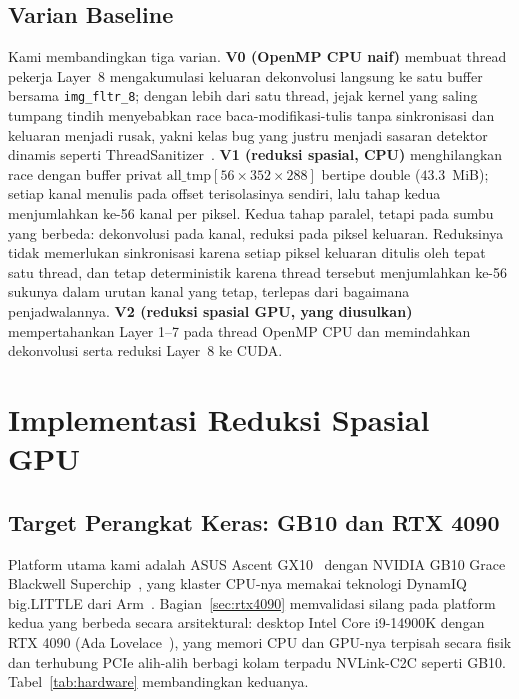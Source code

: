 \documentclass[conference]{IEEEtran}
\begin{document}
\subsection{Varian Baseline}
Kami membandingkan tiga varian. \textbf{V0 (OpenMP CPU naif)} membuat thread pekerja Layer~8 mengakumulasi keluaran dekonvolusi langsung ke satu buffer bersama \texttt{img\_fltr\_8}; dengan lebih dari satu thread, jejak kernel yang saling tumpang tindih menyebabkan race baca-modifikasi-tulis tanpa sinkronisasi dan keluaran menjadi rusak, yakni kelas bug yang justru menjadi sasaran detektor dinamis seperti ThreadSanitizer~\cite{serebryany2009threadsanitizer}. \textbf{V1 (reduksi spasial, CPU)} menghilangkan race dengan buffer privat $\text{all\_tmp}[56 \times 352 \times 288]$ bertipe double ($43.3$~MiB); setiap kanal menulis pada offset terisolasinya sendiri, lalu tahap kedua menjumlahkan ke-56 kanal per piksel. Kedua tahap paralel, tetapi pada sumbu yang berbeda: dekonvolusi pada kanal, reduksi pada piksel keluaran. Reduksinya tidak memerlukan sinkronisasi karena setiap piksel keluaran ditulis oleh tepat satu thread, dan tetap deterministik karena thread tersebut menjumlahkan ke-56 sukunya dalam urutan kanal yang tetap, terlepas dari bagaimana penjadwalannya. \textbf{V2 (reduksi spasial GPU, yang diusulkan)} mempertahankan Layer 1--7 pada thread OpenMP CPU dan memindahkan dekonvolusi serta reduksi Layer~8 ke CUDA.

\section{Implementasi Reduksi Spasial GPU}

\subsection{Target Perangkat Keras: GB10 dan RTX 4090}
Platform utama kami adalah ASUS Ascent GX10~\cite{asusgx10_datasheet} dengan NVIDIA GB10 Grace Blackwell Superchip~\cite{nvidiagb10_2025}, yang klaster CPU-nya memakai teknologi DynamIQ big.LITTLE dari Arm~\cite{armdynamiq}. Bagian~\ref{sec:rtx4090} memvalidasi silang pada platform kedua yang berbeda secara arsitektural: desktop Intel Core i9-14900K dengan RTX 4090 (Ada Lovelace~\cite{nvidiaada2022}), yang memori CPU dan GPU-nya terpisah secara fisik dan terhubung PCIe alih-alih berbagi kolam terpadu NVLink-C2C seperti GB10. Tabel~\ref{tab:hardware} membandingkan keduanya.
\end{document}

